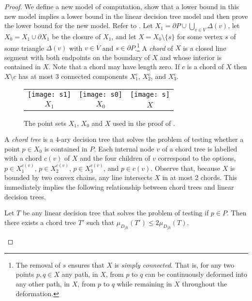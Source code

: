 \documentclass[charterfonts,lotsofwhite]{patmorin}
\newcommand{\boundary}{\partial}
\begin{document}
\begin{proof}

We define a new model of computation, show that a lower bound in this
new model implies a lower bound in the linear decision tree model and
then prove the lower bound for the new model.  Refer to .
Let $X_1= \boundary P \cup \bigcup_{v\in V} \Delta(v)$, let
$X_0=X_1\cup\boundary X_1$ be the closure of $X_1$, and let
$X=X_0\setminus\{s\}$ for some vertex $s$ of some triangle $\Delta(v)$
with $v\in V$ and $s\in\boundary P$.\footnote{The removal of $s$
ensures that $X$ is \emph{simply connected}.  That is, for any two
points $p,q\in X$ any path, in $X$, from $p$ to $q$ can be
continuously deformed into any other path, in $X$, from $p$ to $q$
while remaining in $X$ throughout the deformation.} A \emph{chord} of
$X$ is a closed line segment with both endpoints on the boundary of
$X$ and whose interior is contained in $X$. Note that a chord may have
length zero.  If $c$ is a chord of $X$ then $X\setminus c$ has at most
3 connected components $X^c_1$, $X^c_2$, and $X^c_3$.

\begin{figure}
\begin{center}
\begin{tabular}{ccc}
\texttt{[image: s1]} &
\texttt{[image: s0]} &
\texttt{[image: s]} \\
$X_1$ & $X_0$ & $X$ 
\end{tabular}
\end{center}
\caption{The point sets $X_1$, $X_0$ and $X$ used in the proof of
.}
\end{figure}

A \emph{chord tree} is a $4$-ary decision tree that solves the problem
of testing whether a point $p\in X_0$ is contained in $P$.  Each
internal node $v$ of a chord tree is labelled with a chord $c(v)$ of
$X$ and the four children of $v$ correspond to the options,
$p\in X^{c(v)}_1$, $p\in X^{c(v)}_2$, $p\in X^{c(v)}_3$, and $p\in c(v)$.
Observe that, because $X$ is bounded by two convex chains, any line
intersects $X$ in at most 2 chords.  This immediately implies the
following relationship between chord trees and linear decision trees.
\begin{clm}
Let $T$ be any linear decision tree that solves the problem of testing
if $p\in P$.  Then there exists a chord tree $T'$ such that 
$\mu_{D_{|R}}(T') \le 2\mu_{D_{|R}}(T)$.
\end{clm}


\end{proof}
\end{document}
